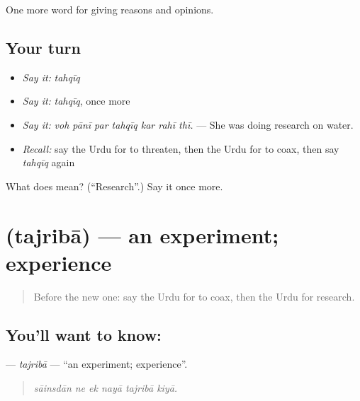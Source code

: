 \begin{grammarlens}[title={What you've built}]
One more word for giving reasons and opinions.
\end{grammarlens}

\subsection*{Your turn}
\begin{itemize}
\raggedright
  \item \emph{Say it:} \emph{tahqīq}
  \item \emph{Say it:} \emph{tahqīq}, once more
  \item \emph{Say it:} \emph{voh pānī par tahqīq kar rahī thī.} — She was doing research on water.
  \item \emph{Recall:} say the Urdu for to threaten, then the Urdu for to coax, then say \emph{tahqīq} again
\end{itemize}

\begin{tcolorbox}[breakable,colback=teal!4,colframe=teal!35!black,title={Before you move on}]
What does  mean? (\textquotedblleft{}Research\textquotedblright{}.) Say it once more.
\end{tcolorbox}
\section[\texorpdfstring{\ur{تجربہ} (tajribā)}{تجربہ (tajribā)}]{ (tajribā) — an experiment; experience}

\label{lesson:UR-C349-tajriba}



\begin{quote}
Before the new one: say the Urdu for to coax, then the Urdu for research.
\end{quote}

\subsection*{You'll want to know: }
\textbf{} — \emph{tajribā} — \textquotedblleft{}an experiment; experience\textquotedblright{}.

\begin{quote}
     
\end{quote}

\begin{quote}
\emph{sāinsdān ne ek nayā tajribā kiyā.}
\end{quote}

